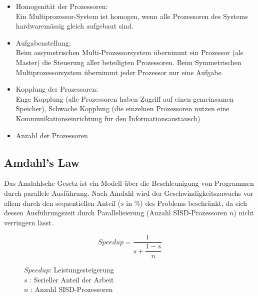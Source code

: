 \begin{itemize}[noitemsep,topsep=0pt]
	\item Homogenität der Prozessoren:\\
	Ein Multiprozessor-System ist homogen, wenn alle Prozessoren des Systems hardwaremässig gleich aufgebaut sind.
	
	\item Aufgabenstellung:\\
	Beim assymetrischen Multi-Prozessorsystem übernimmt ein Prozessor (als Master) die Steuerung aller beteiligten Prozessoren.
	Beim Symmetrischen Multiprozessorsystem übernimmt jeder Prozessor nur eine Aufgabe.
	
	\item Kopplung der Prozessoren:\\
	Enge Kopplung (alle Prozessoren haben Zugriff auf einen gemeinsamen Speicher), Schwache Kopplung (die einzelnen Prozessoren nutzen eine Kommunikationseinrichtung für den Informationsaustausch)
	
	\item Anzahl der Prozessoren
\end{itemize}

\subsection{Amdahl's Law}

Das Amdahlsche Gesetz ist ein Modell über die Beschleunigung von Programmen durch parallele Ausführung.
Nach Amdahl wird der Geschwindigkeitszuwachs vor allem durch den sequentiellen Anteil ($s$ in \%) des Problems beschränkt, da sich dessen Ausführungszeit durch Parallelisierung (Anzahl SISD-Prozessoren $n$) nicht verringern lässt.

\begin{figure}[ht]
	\begin{minipage}[t]{0.475\textwidth}
\begin{equation*}
Speedup = \dfrac{1}{s+ \dfrac{1-s}{n}}
\end{equation*}
	\end{minipage}
	\hfill
	\begin{minipage}[t]{0.475\textwidth}
		$Speedup$: Leistungssteigerung\\
		$s$      : Serieller Anteil der Arbeit\\
		$n$      : Anzahl SISD-Prozessoren
	\end{minipage}	
\end{figure}

